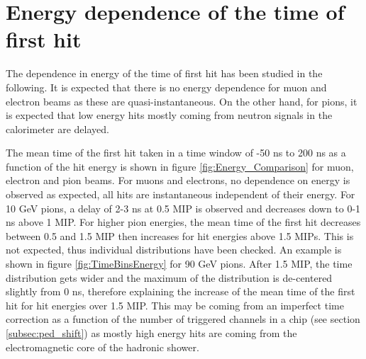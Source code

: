 \section{Energy dependence of the time of first hit}

The dependence in energy of the time of first hit has been studied in the following. It is expected that there is no energy dependence for muon and electron beams as these are quasi-instantaneous. On the other hand, for pions, it is expected that low energy hits mostly coming from neutron signals in the calorimeter are delayed.

The mean time of the first hit taken in a time window of -50 ns to 200 ns as a function of the hit energy is shown in figure \ref{fig:Energy_Comparison} for muon, electron and pion beams. For muons and electrons, no dependence on energy is observed as expected, all hits are instantaneous independent of their energy. For 10 GeV pions, a delay of 2-3 ns at 0.5 MIP is observed and decreases down to 0-1 ns above 1 MIP. For higher pion energies, the mean time of the first hit decreases between 0.5 and 1.5 MIP then increases for hit energies above 1.5 MIPs. This is not expected, thus individual distributions have been checked. An example is shown in figure \ref{fig:TimeBinsEnergy} for 90 GeV pions. After 1.5 MIP, the time distribution gets wider and the maximum of the distribution is de-centered slightly from 0 ns, therefore explaining the increase of the mean time of the first hit for hit energies over 1.5 MIP. This may be coming from an imperfect time correction as a function of the number of triggered channels in a chip (see section \ref{subsec:ped_shift}) as mostly high energy hits are coming from the electromagnetic core of the hadronic shower.

